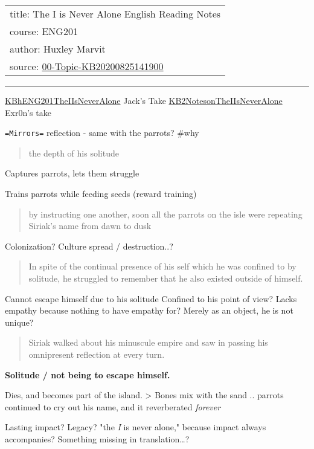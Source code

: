 \documentclass[letterpaper]{article}
\date{\today}
\title{}
\begin{document}
\begin{center}
\begin{tabular}{l}
title: The I is Never Alone English Reading Notes\\
course: ENG201\\
author: Huxley Marvit\\
source: \href{00-Topic-KB20200825141900.org}{00-Topic-KB20200825141900}\\
\end{tabular}
\end{center}

\noindent\rule{\textwidth}{0.5pt}

\href{KBhENG201TheIIsNeverAlone.org}{KBhENG201TheIIsNeverAlone} Jack's
Take \href{KB2NotesonTheIIsNeverAlone.org}{KB2NotesonTheIIsNeverAlone}
Exr0n's take

\texttt{=Mirrors=} reflection - same with the parrots? \#why

\begin{quote}
the depth of his solitude
\end{quote}

Captures parrots, lets them struggle

Trains parrots while feeding seeds (reward training)

\begin{quote}
by instructing one another, soon all the parrots on the isle were
repeating Siriak's name from dawn to dusk
\end{quote}

Colonization? Culture spread / destruction..?

\begin{quote}
In spite of the continual presence of his self which he was confined
to by solitude, he struggled to remember that he also existed outside
of himself.
\end{quote}

Cannot escape himself due to his solitude Confined to his point of view?
Lacks empathy because nothing to have empathy for? Merely as an object,
he is not unique?

\begin{quote}
Siriak walked about his minuscule empire and saw in passing his
omnipresent reflection at every turn.
\end{quote}

\textbf{Solitude / not being to escape himself.}

Dies, and becomes part of the island. > Bones mix with the sand ..
parrots continued to cry out his name, and it reverberated \emph{forever}

Lasting impact? Legacy? "the \emph{I} is never alone," because impact always
accompanies? Something missing in translation\ldots{}?
\end{document}
